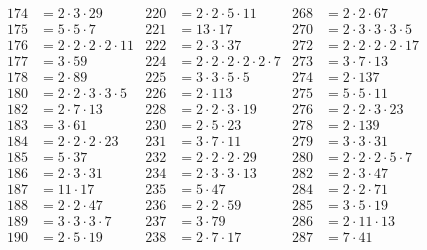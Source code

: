 \begin{align*}
  174&=2\cdot3\cdot29                        & 220&=2\cdot2\cdot5\cdot11            & 268&=2\cdot2\cdot67                              \\
  175&=5\cdot5\cdot7                         & 221&=13\cdot17                       & 270&=2\cdot3\cdot3\cdot3\cdot5                   \\
  176&=2\cdot2\cdot2\cdot2\cdot11            & 222&=2\cdot3\cdot37                  & 272&=2\cdot2\cdot2\cdot2\cdot17                  \\
  177&=3\cdot59                              & 224&=2\cdot2\cdot2\cdot2\cdot2\cdot7 & 273&=3\cdot7\cdot13                              \\
  178&=2\cdot89                              & 225&=3\cdot3\cdot5\cdot5             & 274&=2\cdot137                                   \\
  180&=2\cdot2\cdot3\cdot3\cdot5             & 226&=2\cdot113                       & 275&=5\cdot5\cdot11                              \\
  182&=2\cdot7\cdot13                        & 228&=2\cdot2\cdot3\cdot19            & 276&=2\cdot2\cdot3\cdot23                        \\
  183&=3\cdot61                              & 230&=2\cdot5\cdot23                  & 278&=2\cdot139                                   \\
  184&=2\cdot2\cdot2\cdot23                  & 231&=3\cdot7\cdot11                  & 279&=3\cdot3\cdot31                              \\
  185&=5\cdot37                              & 232&=2\cdot2\cdot2\cdot29            & 280&=2\cdot2\cdot2\cdot5\cdot7                   \\
  186&=2\cdot3\cdot31                        & 234&=2\cdot3\cdot3\cdot13            & 282&=2\cdot3\cdot47                              \\
  187&=11\cdot17                             & 235&=5\cdot47                        & 284&=2\cdot2\cdot71                              \\
  188&=2\cdot2\cdot47                        & 236&=2\cdot2\cdot59                  & 285&=3\cdot5\cdot19                              \\
  189&=3\cdot3\cdot3\cdot7                   & 237&=3\cdot79                        & 286&=2\cdot11\cdot13                             \\
  190&=2\cdot5\cdot19                        & 238&=2\cdot7\cdot17                  & 287&=7\cdot41                                    \\

\end{align*}
